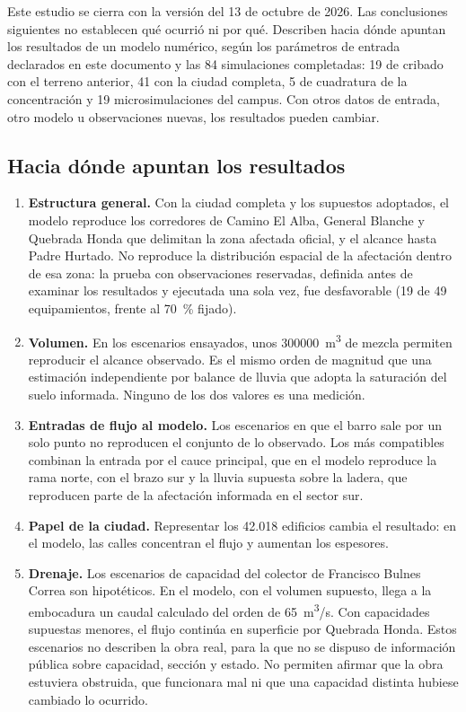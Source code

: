 Este estudio se cierra con la versión del 13 de octubre de 2026. Las conclusiones siguientes no establecen qué ocurrió ni por qué. Describen hacia dónde apuntan los resultados de un modelo numérico, según los parámetros de entrada declarados en este documento y las 84 simulaciones completadas: 19 de cribado con el terreno anterior, 41 con la ciudad completa, 5 de cuadratura de la concentración y 19 microsimulaciones del campus. Con otros datos de entrada, otro modelo u observaciones nuevas, los resultados pueden cambiar.

\subsection*{Hacia dónde apuntan los resultados}
\begin{enumerate}
\item \textbf{Estructura general.} Con la ciudad completa y los supuestos adoptados, el modelo reproduce los corredores de Camino El Alba, General Blanche y Quebrada Honda que delimitan la zona afectada oficial, y el alcance hasta Padre Hurtado. No reproduce la distribución espacial de la afectación dentro de esa zona: la prueba con observaciones reservadas, definida antes de examinar los resultados y ejecutada una sola vez, fue desfavorable (19 de 49 equipamientos, frente al \SI{70}{\percent} fijado).
\item \textbf{Volumen.} En los escenarios ensayados, unos \SI{300000}{m^3} de mezcla permiten reproducir el alcance observado. Es el mismo orden de magnitud que una estimación independiente por balance de lluvia que adopta la saturación del suelo informada. Ninguno de los dos valores es una medición.
\item \textbf{Entradas de flujo al modelo.} Los escenarios en que el barro sale por un solo punto no reproducen el conjunto de lo observado. Los más compatibles combinan la entrada por el cauce principal, que en el modelo reproduce la rama norte, con el brazo sur y la lluvia supuesta sobre la ladera, que reproducen parte de la afectación informada en el sector sur.
\item \textbf{Papel de la ciudad.} Representar los 42.018 edificios cambia el resultado: en el modelo, las calles concentran el flujo y aumentan los espesores.
\item \textbf{Drenaje.} Los escenarios de capacidad del colector de Francisco Bulnes Correa son hipotéticos. En el modelo, con el volumen supuesto, llega a la embocadura un caudal calculado del orden de \SI{65}{m^3/s}. Con capacidades supuestas menores, el flujo continúa en superficie por Quebrada Honda. Estos escenarios no describen la obra real, para la que no se dispuso de información pública sobre capacidad, sección y estado. No permiten afirmar que la obra estuviera obstruida, que funcionara mal ni que una capacidad distinta hubiese cambiado lo ocurrido.

\end{enumerate}
